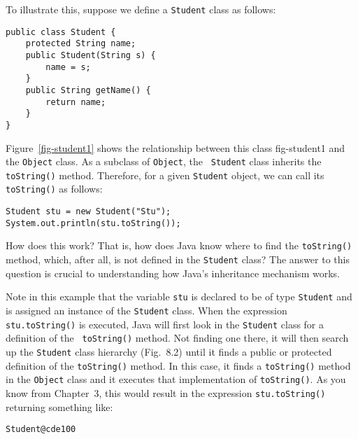 To illustrate this, suppose we define a {\tt Student} class as follows:

\begin{jjjlisting}
\begin{lstlisting}
public class Student {
    protected String name;
    public Student(String s) {
        name = s;
    }
    public String getName() {
        return name;
    }
}
\end{lstlisting}
\end{jjjlisting}

\noindent Figure~\ref{fig-student1} shows the relationship between this class
{fig-student1}
and the {\tt Object} class.  As a subclass of {\tt Object}, the {\tt
Student} class inherits the {\tt toString()} method. Therefore, for a
given {\tt Student} object, we can call its {\tt toString()} as
follows:

\begin{jjjlisting}
\begin{lstlisting}
Student stu = new Student("Stu");
System.out.println(stu.toString());
\end{lstlisting}
\end{jjjlisting}

\noindent How does this work? That is, how does Java know where to
find the {\tt toString()} method, which, after all, is not defined in
the {\tt Student} class?  The answer to this question is crucial to
understanding how Java's inheritance mechanism works.  

Note in this example that the variable {\tt stu} is declared to be of
type {\tt Student} and is assigned an instance of the {\tt Student}
class. When the expression {\tt stu.toString()} is executed, Java will
first look in the {\tt Student} class for a definition of the {\tt
toString()} method. Not finding one there, it will then search up the
{\tt Student} class hierarchy (Fig.~8.2) until it finds a public or
protected definition of the {\tt toString()} method. In this case, it
finds a {\tt toString()} method in the {\tt Object} class and it
executes that implementation of {\tt toString()}.  As you know from
Chapter~3, this would result in the expression {\tt stu.toString()}
returning something like:

\begin{jjjlisting}
\begin{lstlisting}
Student@cde100
\end{lstlisting}
\end{jjjlisting}

